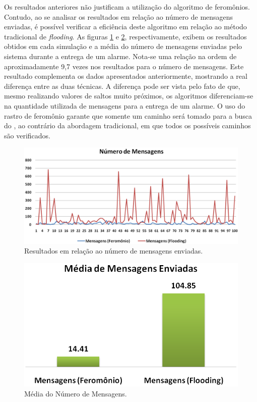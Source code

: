 Os resultados anteriores não justificam a utilização do algoritmo de feromônios. Contudo, ao se analisar os resultados em relação ao número de mensagens enviadas, é possível verificar a eficiência deste algoritmo em relação ao método tradicional de \emph{flooding}. As figuras \ref{fig:messages} e \ref{fig:messages_mean}, respectivamente, exibem os resultados obtidos em cada simulação e a média do número de mensagens enviadas pelo sistema durante a entrega de um alarme. Nota-se uma relação na ordem de aproximadamente 9,7 vezes nos resultados para o número de mensagens. Este resultado complementa os dados apresentados anteriormente, mostrando a real diferença entre as duas técnicas. A diferença pode ser vista pelo fato de que, mesmo realizando valores de saltos muito próximos, os algoritmos diferenciam-se na quantidade utilizada de mensagens para a entrega de um alarme. O uso do rastro de feromônio garante que somente um caminho será tomado para a busca do \vant, ao contrário da abordagem tradicional, em que todos os possíveis caminhos são verificados.

 \begin{figure}[h!]
 \centering
 \includegraphics[width=13cm]{results/messages.png}
 \caption{Resultados em relação ao número de mensagens enviadas.}
  \label{fig:messages}
 \end{figure}

 \begin{figure}[h!]
 \centering
 \includegraphics{results/messages_mean.png}
 \caption{Média do Número de Mensagens.}
  \label{fig:messages_mean}
 \end{figure}

